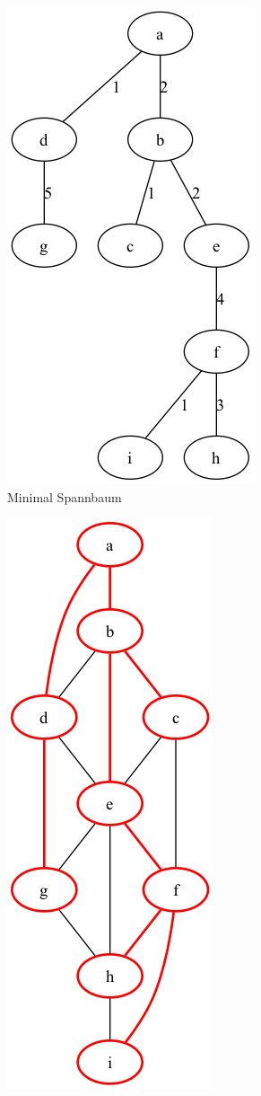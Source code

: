 \documentclass[a4paper,11pt]{report}
\begin{document}
    \begin{figure}[htbp]
        \centering
        \begin{subfigure}[b]{0.3\textwidth}
            \includegraphics[height=0.2\textheight]{a01a_mst}
            \caption{Minimal Spannbaum}
            \label{fig:a01_mst}
        \end{subfigure}
        \begin{subfigure}[b]{0.3\textwidth}
            \includegraphics[height=0.2\textheight]{a01a_graph_highlighted}

\end{subfigure}
\end{figure}
\end{document}
